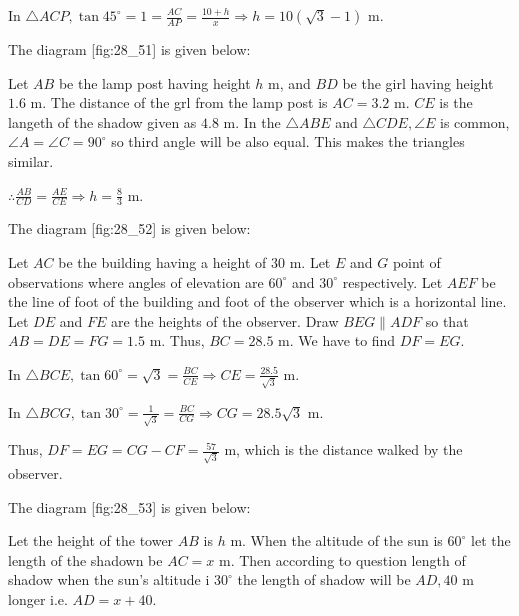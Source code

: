   In $\triangle ACP, \tan45^\circ = 1 = \frac{AC}{AP} = \frac{10 + h}{x} \Rightarrow h = 10(\sqrt{3} - 1)$ m.
\item The diagram [fig:28_51] is given below:

  \startplacefigure[reference=fig:28_51]
    \externalfigure[28_51.pdf]
  \stopplacefigure

  Let $AB$ be the lamp post having height $h$ m, and $BD$ be the girl having height $1.6$ m. The distance
  of the grl from the lamp post is $AC = 3.2$ m. $CE$ is the langeth of the shadow given as $4.8$ m. In the
  $\triangle ABE$ and $\triangle CDE, \angle E$ is common, $\angle A = \angle C = 90^\circ$ so third angle will
  be also equal. This makes the triangles similar.

  $\therefore \frac{AB}{CD} = \frac{AE}{CE} \Rightarrow h = \frac{8}{3}$ m.

\item The diagram [fig:28_52] is given below:

  \startplacefigure[reference=fig:28_52]
    \externalfigure[28_52.pdf]
  \stopplacefigure

  Let $AC$ be the building having a height of $30$ m. Let $E$ and $G$ point of observations where angles
  of elevation are $60^\circ$ and $30^\circ$ respectively. Let $AEF$ be the line of foot of the building and
  foot of the observer which is a horizontal line. Let $DE$ and $FE$ are the heights of the
  observer. Draw $BEG\parallel ADF$ so that $AB = DE = FG = 1.5$ m. Thus, $BC = 28.5$ m. We have to find
  $DF = EG$.

  In $\triangle BCE, \tan60^\circ = \sqrt{3} = \frac{BC}{CE} \Rightarrow CE = \frac{28.5}{\sqrt{3}}$ m.

  In $\triangle BCG, \tan30^\circ = \frac{1}{\sqrt{3}} = \frac{BC}{CG} \Rightarrow CG = 28.5\sqrt{3}$ m.

  Thus, $DF = EG = CG - CF = \frac{57}{\sqrt{3}}$ m, which is the distance walked by the observer.

\item The diagram [fig:28_53] is given below:

  \startplacefigure[reference=fig:28_53]
    \externalfigure[28_53.pdf]
  \stopplacefigure

  Let the height of the tower $AB$ is $h$ m. When the altitude of the sun is $60^\circ$ let the length of the
  shadown be $AC = x$ m. Then according to question length of shadow when the sun's altitude i $30^\circ$ the length
  of shadow will be $AD, 40$ m longer i.e. $AD = x + 40$.

